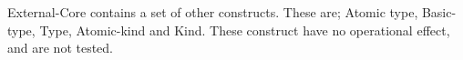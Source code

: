External-Core contains a set of other constructs. These are;
Atomic type, Basic-type, Type, Atomic-kind and Kind. These construct
have no operational effect, and are not tested.

\begin{comment}
\subsubsubsection*{Atomic type}

Types have no effect.

\subsubsubsection*{Basic type}

Types have no effect.

\subsubsubsection*{Type}

Types have no effect.

\subsubsubsection*{Atomic kind}

Kinds have no effect.

\subsubsubsection*{Kind}

Kinds have no effect.
\end{comment}

